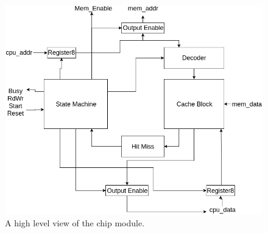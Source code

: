 \documentclass[10pt]{article}
\begin{document}
\begin{figure}
    \centering
    \includegraphics[width=\textwidth]{chd.png}
    \caption{A high level view of the chip module.}
    \label{chiphd}
\end{figure}
\end{document}
